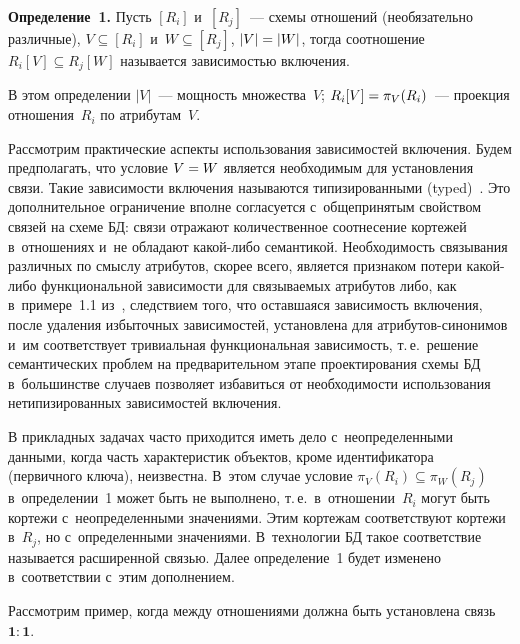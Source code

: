 \begin{multicols}{2}
  \smallskip

  \noindent
  \textbf{Определение~1.} Пусть $[R_i]$ и~$[R_j]$~--- схемы отношений 
  (необязательно различные), $V\subseteq [R_i]$ и~$W\subseteq [R_j]$, $\vert V\vert
\hm= \vert W\vert$, тогда соотношение $R_i[V]\subseteq R_j[W]$ называется
зависимостью включения.

  \smallskip

  В этом определении $\vert V\vert$~--- мощность множества~$V$;
$R_i[V]\hm= \pi_V(R_i)$~--- проекция отношения~$R_i$ по атрибутам~$V$.

Рассмотрим практические аспекты использования
зависимостей включения. Будем предполагать, что условие $V\hm= W$
является необходимым для установления связи. Такие зависимости включения
называются типизированными (typed)~\cite{6-z, 7-z}. Это дополнительное
ограничение вполне согласуется с~общепринятым свойством связей на схеме
БД: связи отражают количественное соотнесение кортежей в~отношениях и~не
обладают ка\-кой-ли\-бо семантикой. Необходимость связывания различных по
смыслу атрибутов, скорее всего, является признаком потери ка\-кой-ли\-бо
функциональной зависимости для связываемых атрибутов либо, как\linebreak
 в~примере~1.1 из~\cite{7-z}, 
следствием того, что остав\-шаяся зависимость
включения, после удаления избыточных зависимостей, установлена для
ат\-ри\-бу\-тов-си\-но\-ни\-мов и~им соответствует тривиальная функциональная
зависимость, т.\,е.\ решение семантических проблем на предварительном
этапе проектирования схемы БД в~большинстве случаев позволяет
избавиться от не\-об\-хо\-ди\-мости использования нетипизированных зависимостей
включения.

  В прикладных задачах часто приходится иметь дело с~неопределенными
данными, когда часть характеристик объектов, кроме идентификатора
(первичного ключа), неизвестна. В~этом случае условие $\pi_V(R_i)\subseteq
\pi_W(R_j)$ в~определении~1 может быть не выполнено, т.\,е.\
в~отношении~$R_i$ могут быть кортежи с~неопределенными значениями.
Этим кортежам соответствуют кортежи в~$R_j$, но с~определенными
значениями. В~технологии БД такое соответствие называется
расширенной связью. Далее определение~1 будет изменено в~соответствии с~этим дополнением.

  Рассмотрим пример, когда между отношениями должна быть установлена
связь $\mathbf{1}:\mathbf{1}$.

  \medskip


\end{multicols}
